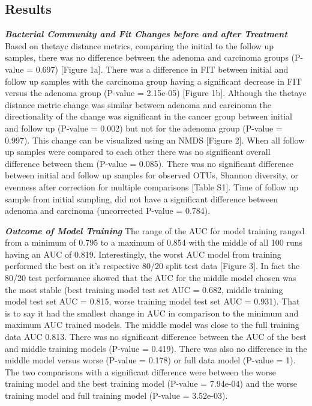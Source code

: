 \documentclass[12pt,]{article}
\begin{document}
\newpage

\subsection{Results}\label{results}

\textbf{\emph{Bacterial Community and Fit Changes before and after
Treatment}} Based on thetayc distance metrics, comparing the initial to
the follow up samples, there was no difference between the adenoma and
carcinoma groups (P-value = 0.697) {[}Figure 1a{]}. There was a
difference in FIT between initial and follow up samples with the
carcinoma group having a significant decrease in FIT versus the adenoma
group (P-value = 2.15e-05) {[}Figure 1b{]}. Although the thetayc
distance metric change was similar between adenoma and carcinoma the
directionality of the change was significant in the cancer group between
initial and follow up (P-value = 0.002) but not for the adenoma group
(P-value = 0.997). This change can be visualized using an NMDS {[}Figure
2{]}. When all follow up samples were compared to each other there was
no significant overall difference between them (P-value = 0.085). There
was no significant difference between initial and follow up samples for
observed OTUs, Shannon diversity, or evenness after correction for
multiple comparisons {[}Table S1{]}. Time of follow up sample from
initial sampling, did not have a significant difference between adenoma
and carcinoma (uncorrected P-value = 0.784).

\textbf{\emph{Outcome of Model Training}} The range of the AUC for model
training ranged from a minimum of 0.795 to a maximum of 0.854 with the
middle of all 100 runs having an AUC of 0.819. Interestingly, the worst
AUC model from training performed the best on it's respective 80/20
split test data {[}Figure 3{]}. In fact the 80/20 test performance
showed that the AUC for the middle model chosen was the most stable
(best training model test set AUC = 0.682, middle training model test
set AUC = 0.815, worse training model test set AUC = 0.931). That is to
say it had the smallest change in AUC in comparison to the minimum and
maximum AUC trained models. The middle model was close to the full
training data AUC 0.813. There was no significant difference between the
AUC of the best and middle training models (P-value = 0.419). There was
also no difference in the middle model versus worse (P-value = 0.178) or
full data model (P-value = 1). The two comparisons with a significant
difference were between the worse training model and the best training
model (P-value = 7.94e-04) and the worse training model and full
training model (P-value = 3.52e-03).
\end{document}
